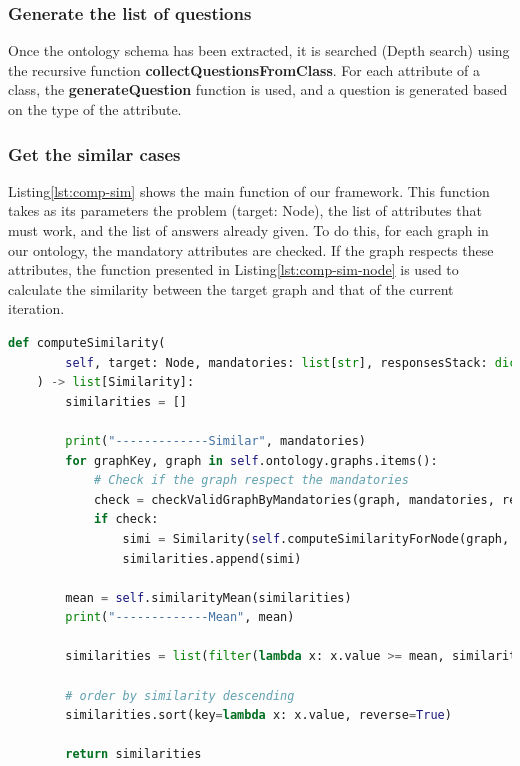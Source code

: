 \subsubsection{Generate the list of questions}
Once the ontology schema has been extracted, it is searched (Depth search) using the recursive function \textbf{collectQuestionsFromClass}. For each attribute of a class, the \textbf{generateQuestion} function is used, and a question is generated based on the type of the attribute.

\subsubsection{Get the similar cases}
Listing\ref{lst:comp-sim} shows the main function of our framework. This function takes as its parameters the problem (target: Node), the list of attributes that must work, and the list of answers already given. To do this, for each graph in our ontology, the mandatory attributes are checked. If the graph respects these attributes, the function presented in Listing\ref{lst:comp-sim-node} is used to calculate the similarity between the target graph and that of the current iteration.\\


\begin{lstlisting}[language=Python, caption=Function to find the similarity between one case and all the cases in the data-base, label={lst:comp-sim}]
def computeSimilarity(
        self, target: Node, mandatories: list[str], responsesStack: dict[str, Any]
    ) -> list[Similarity]:
        similarities = []

        print("-------------Similar", mandatories)
        for graphKey, graph in self.ontology.graphs.items():
            # Check if the graph respect the mandatories
            check = checkValidGraphByMandatories(graph, mandatories, responsesStack)
            if check:
                simi = Similarity(self.computeSimilarityForNode(graph, target), graph)
                similarities.append(simi)

        mean = self.similarityMean(similarities)
        print("-------------Mean", mean)

        similarities = list(filter(lambda x: x.value >= mean, similarities))

        # order by similarity descending
        similarities.sort(key=lambda x: x.value, reverse=True)

        return similarities
\end{lstlisting}
    
